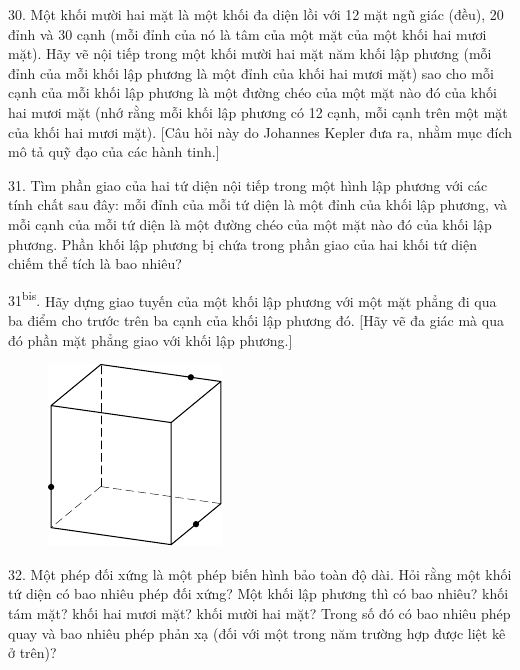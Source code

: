 \begin{problem}{30.}
	Một khối mười hai mặt là một khối đa diện lồi với 12 mặt ngũ giác (đều), 20 đỉnh và 30 cạnh (mỗi đỉnh của nó là tâm của một mặt của một khối hai mươi mặt). Hãy vẽ nội tiếp trong một khối mười hai mặt năm khối lập phương (mỗi đỉnh của mỗi khối lập phương là một đỉnh của khối hai mươi mặt) sao cho mỗi cạnh của mỗi khối lập phương là một đường chéo của một mặt nào đó của khối hai mươi mặt (nhớ rằng mỗi khối lập phương có 12 cạnh, mỗi cạnh trên một mặt của khối hai mươi mặt). [Câu hỏi này do Johannes Kepler đưa ra, nhằm mục đích mô tả quỹ đạo của các hành tinh.]
\end{problem}

\begin{problem}{31.}
	Tìm phần giao của hai tứ diện nội tiếp trong một hình lập phương với các tính chất sau đây: mỗi đỉnh của mỗi tứ diện là một đỉnh của khối lập phương, và mỗi cạnh của mỗi tứ diện là một đường chéo của một mặt nào đó của khối lập phương.
	Phần khối lập phương bị chứa trong phần giao của hai khối tứ diện chiếm thể tích là bao nhiêu?
\end{problem}

\begin{problem}{31\textsuperscript{bis}.}
	Hãy dựng giao tuyến của một khối lập phương với một mặt phẳng đi qua ba điểm cho trước trên ba cạnh của khối lập phương đó. [Hãy vẽ đa giác mà qua đó phần mặt phẳng giao với khối lập phương.]
	\begin{figure}
		\includegraphics{resources/taskbook-15}
	\end{figure}
\end{problem}

\begin{problem}{32.}
	Một phép đối xứng là một phép biến hình bảo toàn độ dài. Hỏi rằng một khối tứ diện có bao nhiêu phép đối xứng? Một khối lập phương thì có bao nhiêu? khối tám mặt? khối hai mươi mặt? khối mười hai mặt? Trong số đó có bao nhiêu phép quay và bao nhiêu phép phản xạ (đối với một trong năm trường hợp được liệt kê ở trên)?
\end{problem}

